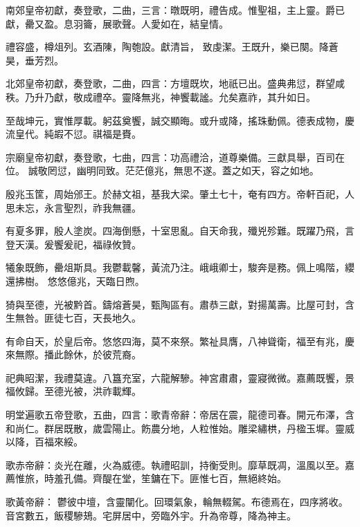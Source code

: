 \begin{pinyinscope}
 南郊皇帝初獻，奏登歌，二曲，三言：暾既明，禮告成。惟聖祖，主上靈。爵已獻，罍又盈。息羽籥，展歌聲。人愛如在，結皇情。



 禮容盛，樽俎列。玄酒陳，陶匏設。獻清旨，
 致虔潔。王既升，樂已闋。降蒼昊，垂芳烈。



 北郊皇帝初獻，奏登歌，二曲，四言：方壇既坎，地祇已出。盛典弗愆，群望咸秩。乃升乃獻，敬成禮卒。靈降無兆，神饗載謐。允矣嘉祚，其升如日。



 至哉坤元，實惟厚載。躬茲奠饗，誠交顯晦。或升或降，搖珠動佩。德表成物，慶流皇代。純嘏不愆。祺福是賚。



 宗廟皇帝初獻，奏登歌，七曲，四言：功高禮洽，道尊樂備。三獻具舉，百司在位。
 誠敬罔愆，幽明同致。茫茫億兆，無思不遂。蓋之如天，容之如地。



 殷兆玉筐，周始邠王。於赫文祖，基我大梁。肇土七十，奄有四方。帝軒百祀，人思未忘，永言聖烈，祚我無疆。



 有夏多罪，殷人塗炭。四海倒懸，十室思亂。自天命我，殲兇殄難。既躍乃飛，言登天漢。爰饗爰祀，福祿攸贊。



 犧象既飾，罍俎斯具。我鬱載馨，黃流乃注。峨峨卿士，駿奔是務。佩上鳴階，纓還拂樹。
 悠悠億兆，天臨日煦。



 猗與至德，光被黔首。鑄熔蒼昊，甄陶區有。肅恭三獻，對揚萬壽。比屋可封，含生無咎。匪徒七百，天長地久。



 有命自天，於皇后帝。悠悠四海，莫不來祭。繁祉具膺，八神聳衛，福至有兆，慶來無際。播此餘休，於彼荒裔。



 祀典昭潔，我禮莫違。八簋充室，六龍解驂。神宮肅肅，靈寢微微。嘉薦既饗，景福攸歸。至德光被，洪祚載輝。



 明堂遍歌五帝登歌，五曲，四言：歌青帝辭：帝居在震，龍德司春。開元布澤，含和尚仁。群居既散，歲雲陽止。飭農分地，人粒惟始。雕梁繡栱，丹楹玉墀。靈威以降，百福來綏。



 歌赤帝辭：炎光在離，火為威德。執禮昭訓，持衡受則。靡草既凋，溫風以至。嘉薦惟旅，時羞孔備。齊醍在堂，笙鏞在下。匪惟七百，無絕終始。



 歌黃帝辭：
 鬱彼中壇，含靈闡化。回環氣象，輪無輟駕。布德焉在，四序將收。音宮數五，飯稷驂鳷。宅屏居中，旁臨外宇。升為帝尊，降為神主。




\end{pinyinscope}
